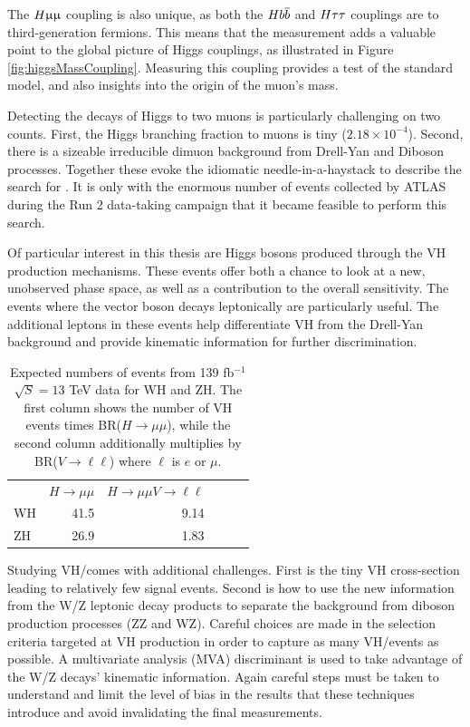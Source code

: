 The $H\upmu\upmu$ coupling is also unique, as both the $Hb\overline{b}$ and $H\tau\tau$ couplings are to third-generation fermions.
This means that the \hmm measurement adds a valuable point to the global picture of Higgs couplings, as illustrated in Figure \ref{fig:higgsMassCoupling}.
Measuring this coupling provides a test of the standard model, and also insights into the origin of the muon's mass.

Detecting the decays of Higgs to two muons is particularly challenging on two counts.
First, the Higgs branching fraction to muons is tiny ($2.18\times10^{-4}$).
Second, there is a sizeable irreducible dimuon background from Drell-Yan and Diboson processes.
Together these evoke the idiomatic needle-in-a-haystack to describe the search for \hmm.
It is only with the enormous number of events collected by ATLAS during the Run 2 data-taking campaign that it became feasible to perform this search.


Of particular interest in this thesis are Higgs bosons produced through the VH production mechanisms.
These events offer both a chance to look at a new, unobserved phase space, as well as a contribution to the overall \hmm sensitivity.
The events where the vector boson decays leptonically are particularly useful.
The additional leptons in these events help differentiate VH from the Drell-Yan background and provide kinematic information for further discrimination.

\begin{table}[htbp]
 \begin{center}
\begin{tabular}{l r r r r r}\toprule
   & $H\to\mu\mu$ & $H\to\mu\mu V\to\ell\ell$ \\
WH & 41.5 & 9.14 \\
ZH & 26.9 & 1.83 \\
\bottomrule\end{tabular}
 \end{center}
 \caption{Expected numbers of events from 139 fb$^{-1}$ $\sqrt{S}=13$ TeV data for WH and ZH. The first column shows the number of VH events times BR($H\to\mu\mu$), while the second column additionally multiplies by BR($V\to\ell\ell$) where $\ell$ is $e$ or $\mu$.}
\label{tab:vh-predict}
\end{table}

Studying VH/\hmm comes with additional challenges.
First is the tiny VH cross-section leading to relatively few signal events.
Second is how to use the new information from the W/Z leptonic decay products to separate the background from diboson production processes (ZZ and WZ).
Careful choices are made in the selection criteria targeted at VH production in order to capture as many VH/\hmm events as possible.
A multivariate analysis (MVA) discriminant is used to take advantage of the W/Z decays' kinematic information.
Again careful steps must be taken to understand and limit the level of bias in the results that these techniques introduce and avoid invalidating the final measurements.

